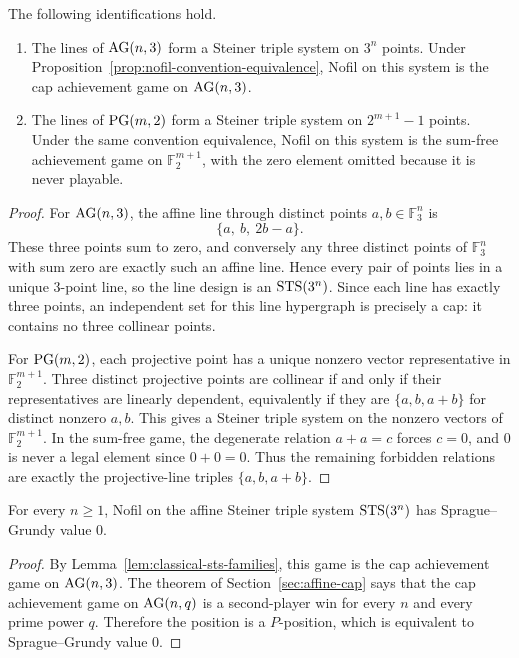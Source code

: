 \begin{lemma}
\label{lem:classical-sts-families}
The following identifications hold.
\begin{enumerate}
  \item The lines of $\mathrm{AG}(n,3)$ form a Steiner triple system on $3^n$ points. Under
    Proposition~\ref{prop:nofil-convention-equivalence}, Nofil on this system is the cap
    achievement game on $\mathrm{AG}(n,3)$.
  \item The lines of $\mathrm{PG}(m,2)$ form a Steiner triple system on $2^{m+1}-1$ points. Under
    the same convention equivalence, Nofil on this system is the sum-free achievement game
    on $\mathbb F_2^{m+1}$, with the zero element omitted because it is never playable.
\end{enumerate}
\end{lemma}

\begin{proof}
For $\mathrm{AG}(n,3)$, the affine line through distinct points $a,b\in\mathbb F_3^n$ is
\[
  \{a,\ b,\ 2b-a\}.
\]
These three points sum to zero, and conversely any three distinct points of
$\mathbb F_3^n$ with sum zero are exactly such an affine line. Hence every pair of
points lies in a unique 3-point line, so the line design is an $\mathrm{STS}(3^n)$. Since each
line has exactly three points, an independent set for this line hypergraph is precisely
a cap: it contains no three collinear points.

For $\mathrm{PG}(m,2)$, each projective point has a unique nonzero vector representative in
$\mathbb F_2^{m+1}$. Three distinct projective points are collinear if and only if their
representatives are linearly dependent, equivalently if they are $\{a,b,a+b\}$ for
distinct nonzero $a,b$. This gives a Steiner triple system on the nonzero vectors of
$\mathbb F_2^{m+1}$. In the sum-free game, the degenerate relation $a+a=c$ forces
$c=0$, and $0$ is never a legal element since $0+0=0$. Thus the remaining forbidden
relations are exactly the projective-line triples $\{a,b,a+b\}$.
\end{proof}

\begin{corollary}
\label{cor:affine-nofil-family}
For every $n\geq 1$, Nofil on the affine Steiner triple system $\mathrm{STS}(3^n)$ has
Sprague--Grundy value $0$.
\end{corollary}

\begin{proof}
By Lemma~\ref{lem:classical-sts-families}, this game is the cap achievement game on
$\mathrm{AG}(n,3)$. The theorem of Section~\ref{sec:affine-cap} says that the cap achievement
game on $\mathrm{AG}(n,q)$ is a second-player win for every $n$ and every prime power $q$.
Therefore the position is a $P$-position, which is equivalent to Sprague--Grundy value
$0$.
\end{proof}

